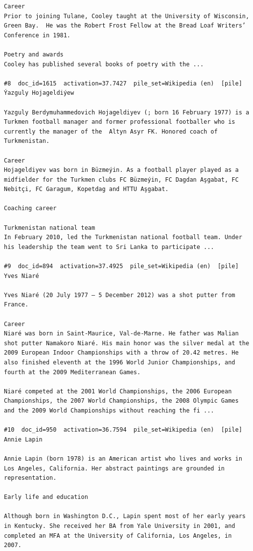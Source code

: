 \begin{verbatim}
Career
Prior to joining Tulane, Cooley taught at the University of Wisconsin, Green Bay.  He was the Robert Frost Fellow at the Bread Loaf Writers’ Conference in 1981.

Poetry and awards
Cooley has published several books of poetry with the ...

#8  doc_id=1615  activation=37.7427  pile_set=Wikipedia (en)  [pile]
Ýazguly Hojageldiýew

Yazguly Berdymuhammedovich Hojageldiyev (; born 16 February 1977) is a Turkmen football manager and former professional footballer who is currently the manager of the  Altyn Asyr FK. Honored coach of Turkmenistan.

Career 
Hojageldiyev was born in Büzmeýin. As a football player played as a midfielder for the Turkmen clubs FC Büzmeýin, FC Dagdan Aşgabat, FC Nebitçi, FC Garagum, Kopetdag and HTTU Aşgabat.

Coaching career

Turkmenistan national team 
In February 2010, led the Turkmenistan national football team. Under his leadership the team went to Sri Lanka to participate ...

#9  doc_id=894  activation=37.4925  pile_set=Wikipedia (en)  [pile]
Yves Niaré

Yves Niaré (20 July 1977 – 5 December 2012) was a shot putter from France.

Career
Niaré was born in Saint-Maurice, Val-de-Marne. He father was Malian shot putter Namakoro Niaré. His main honor was the silver medal at the 2009 European Indoor Championships with a throw of 20.42 metres. He also finished eleventh at the 1996 World Junior Championships, and fourth at the 2009 Mediterranean Games.

Niaré competed at the 2001 World Championships, the 2006 European Championships, the 2007 World Championships, the 2008 Olympic Games and the 2009 World Championships without reaching the fi ...

#10  doc_id=950  activation=36.7594  pile_set=Wikipedia (en)  [pile]
Annie Lapin

Annie Lapin (born 1978) is an American artist who lives and works in Los Angeles, California. Her abstract paintings are grounded in representation.

Early life and education 

Although born in Washington D.C., Lapin spent most of her early years in Kentucky. She received her BA from Yale University in 2001, and completed an MFA at the University of California, Los Angeles, in 2007.


\end{verbatim}
